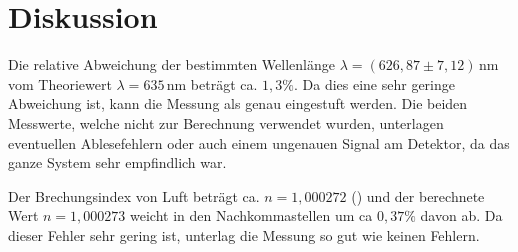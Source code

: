 \section{Diskussion}
\label{sec:Diskussion}

Die relative Abweichung der bestimmten Wellenlänge $\lambda =  (626,87 \pm 7,12)\,\si{\nano\meter}$ vom Theoriewert $\lambda = 635\,\si{\nano\meter}$ beträgt ca. $1,3 \%$.
Da dies eine sehr geringe Abweichung ist, kann die Messung als genau eingestuft werden. Die beiden Messwerte, welche nicht zur Berechnung verwendet wurden, unterlagen eventuellen Ablesefehlern oder auch einem ungenauen Signal am Detektor, da das ganze System sehr empfindlich war.

\noindent Der Brechungsindex von Luft beträgt ca. $n = 1,000272$ (\cite{sample1}) und der berechnete Wert $n = 1,000273$ weicht in den Nachkommastellen um ca $0,37 \%$ davon ab. Da dieser Fehler sehr gering ist, unterlag die Messung so gut wie keinen Fehlern.